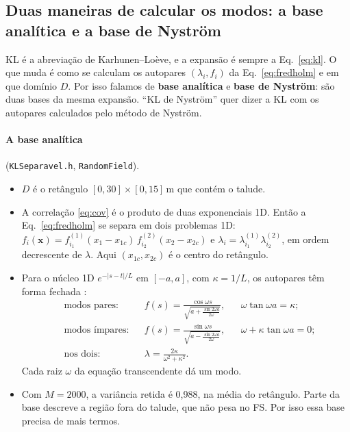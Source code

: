\documentclass[11pt,a4paper]{article}
\begin{document}
\subsection{Duas maneiras de calcular os modos: a base analítica e a base de Nyström}\label{sec:bases}
KL é a abreviação de Karhunen--Loève, e a expansão é sempre a Eq.~\eqref{eq:kl}. O que muda é como se calculam os
autopares $(\lambda_i, f_i)$ da Eq.~\eqref{eq:fredholm} e em que domínio $D$. Por isso falamos de \textbf{base
analítica} e \textbf{base de Nyström}: são duas bases da mesma expansão. ``KL de Nyström'' quer dizer a KL com os
autopares calculados pelo método de Nyström.

\paragraph{A base analítica} (\texttt{KLSeparavel.h}, \texttt{RandomField}).
\begin{itemize}
  \item $D$ é o retângulo $[0, 30]\times[0, 15]$\,m que contém o talude.
  \item A correlação \eqref{eq:cov} é o produto de duas exponenciais 1D. Então a Eq.~\eqref{eq:fredholm} se separa em
    dois problemas 1D: $f_i(\bm x) = f^{(1)}_{i_1}(x_1 - x_{1c})\,f^{(2)}_{i_2}(x_2 - x_{2c})$ e
    $\lambda_i = \lambda^{(1)}_{i_1}\lambda^{(2)}_{i_2}$, em ordem decrescente de $\lambda$. Aqui $(x_{1c}, x_{2c})$ é o
    centro do retângulo.
  \item Para o núcleo 1D $e^{-|s - t|/L}$ em $[-a, a]$, com $\kappa = 1/L$, os autopares têm forma fechada
    \citep[Cap.~2]{ghanem1991}:
    \begin{equation}
      \begin{aligned}
      &\text{modos pares:} && f(s) = \frac{\cos\omega s}{\sqrt{a + \frac{\sin 2\omega a}{2\omega}}},
        && \omega\tan\omega a = \kappa;\\
      &\text{modos ímpares:} && f(s) = \frac{\sin\omega s}{\sqrt{a - \frac{\sin 2\omega a}{2\omega}}},
        && \omega + \kappa\tan\omega a = 0;\\
      &\text{nos dois:} && \lambda = \frac{2\kappa}{\omega^2 + \kappa^2}.
      \end{aligned}
      \label{eq:kl1d}
    \end{equation}
    Cada raiz $\omega$ da equação transcendente dá um modo.
  \item Com $M = 2000$, a variância retida é 0,988, na média do retângulo. Parte da base descreve a região fora do
    talude, que não pesa no FS. Por isso essa base precisa de mais termos.
\end{itemize}
\end{document}
